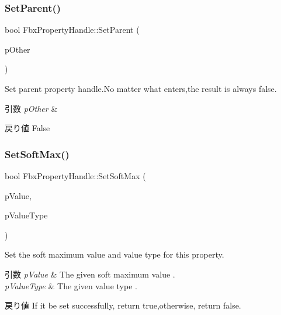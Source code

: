 \subsubsection{\texorpdfstring{Set\+Parent()}{SetParent()}}
{\footnotesize\ttfamily bool Fbx\+Property\+Handle\+::\+Set\+Parent (\begin{DoxyParamCaption}\item[{const \hyperlink{class_fbx_property_handle}{Fbx\+Property\+Handle} \&}]{p\+Other }\end{DoxyParamCaption})}

Set parent property handle.\+No matter what enters,the result is always false. 
\begin{DoxyParams}{引数}
{\em p\+Other} & \\
\hline
\end{DoxyParams}
\begin{DoxyReturn}{戻り値}
False 
\end{DoxyReturn}
\mbox{\label{class_fbx_property_handle_ad4303ec2be34fb9d619fc98e68486784}} 
\subsubsection{\texorpdfstring{Set\+Soft\+Max()}{SetSoftMax()}\hspace{0.1cm}{\footnotesize\ttfamily [1/2]}}
{\footnotesize\ttfamily bool Fbx\+Property\+Handle\+::\+Set\+Soft\+Max (\begin{DoxyParamCaption}\item[{const void $\ast$}]{p\+Value,  }\item[{\hyperlink{fbxpropertytypes_8h_a73913a5ddfb20e57c6f25e9e6784bd92}{E\+Fbx\+Type}}]{p\+Value\+Type }\end{DoxyParamCaption})}

Set the soft maximum value and value type for this property. 
\begin{DoxyParams}{引数}
{\em p\+Value} & The given soft maximum value . \\
\hline
{\em p\+Value\+Type} & The given value type . \\
\hline
\end{DoxyParams}
\begin{DoxyReturn}{戻り値}
If it be set successfully, return true,otherwise, return false. 
\end{DoxyReturn}
\mbox{\label{class_fbx_property_handle_a2581fff85d3c2e73c99d16f2b9c1a66e}} 
